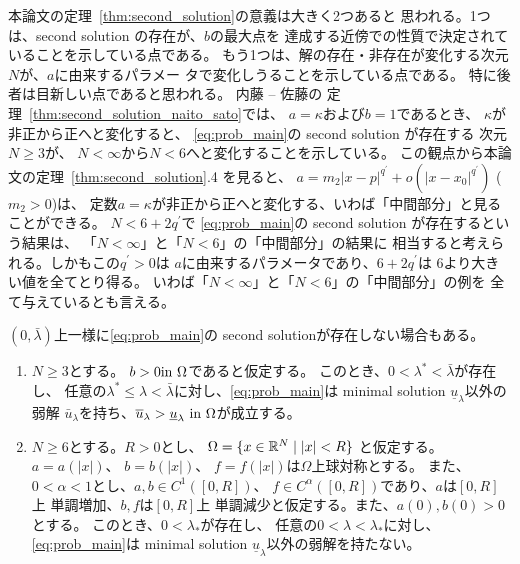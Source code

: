 本論文の定理~\ref{thm:second_solution}の意義は大きく2つあると
思われる。1つは、second solution の存在が、$b$の最大点を
達成する近傍での性質で決定されていることを示している点である。
もう1つは、解の存在・非存在が変化する次元$N$が、$a$に由来するパラメー
タで変化しうることを示している点である。
特に後者は目新しい点であると思われる。
内藤 -- 佐藤の
定理~\ref{thm:second_solution_naito_sato}では、
$a = \kappa$および$b = 1$であるとき、
$\kappa$が非正から正へと変化すると、
\ref{eq:prob_main}の second solution が存在する
次元$N \geq 3$が、
$N < \infty$から$N < 6$へと変化することを示している。
この観点から本論文の定理~\ref{thm:second_solution}.4 を見ると、
$a = m_2 \lvert x - p \rvert^{q^\prime} + o(\lvert x-x_0
\rvert^{q^\prime})$ ($m_2 > 0$)は、
定数$a = \kappa$が非正から正へと変化する、いわば「中間部分」と見ることができる。
$N < 6 + 2q^\prime$で
\ref{eq:prob_main}の second solution が存在するという結果は、
「$N < \infty$」と「$N < 6$」の「中間部分」の結果に
相当すると考えられる。しかもこの$q^\prime > 0$は
$a$に由来するパラメータであり、$6 + 2q^\prime$は
$6$より大きい値を全てとり得る。
いわば「$N < \infty$」と「$N < 6$」の「中間部分」の例を
全て与えているとも言える。

$(0, \bar{\lambda})$上一様に\ref{eq:prob_main}の
second solutionが存在しない場合もある。

\begin{thm} \label{thm:second_solution_nonex}
 \begin{enumerate}[1.]  \sage
  \item $N \geq 3$とする。
        $b > 0 \text{in}~ \Omega$であると仮定する。
        このとき、$0 < \lambda^* < \bar{\lambda}$が存在し、
        任意の$\lambda^* \leq
        \lambda < \bar{\lambda}$に対し、\ref{eq:prob_main}は
        minimal solution $\underline{u}_\lambda$以外の弱解
        $\bar{u}_\lambda$を持ち、$\overline{u}_\lambda >
        \underline{u}_\lambda ~\text{in}~ \Omega$が成立する。
  \item $N \geq 6$とする。$R > 0$とし、
        $\Omega = \{ x \in \mathbb{R}^N \mid \lvert x \rvert < R\}$
        と仮定する。
        $a = a(\lvert x \rvert)$、
        $b = b(\lvert x \rvert)$、
        $f = f(\lvert x \rvert)$は$\Omega$上球対称とする。
        また、$0 < \alpha < 1$とし、$a , b \in C^1([0, R])$、
        $f \in C^\alpha([0, R])$であり、$a$は$[0, R]$上
        単調増加、$b, f$は$[0, R]$上
        単調減少と仮定する。また、$a(0), b(0) > 0$とする。
        このとき、$0 < \lambda_*$が存在し、
        任意の$0 < \lambda < \lambda_*$に対し、
        \ref{eq:prob_main}は
        minimal solution $\underline{u}_\lambda$以外の弱解を持たない。
 \end{enumerate}
\end{thm}

